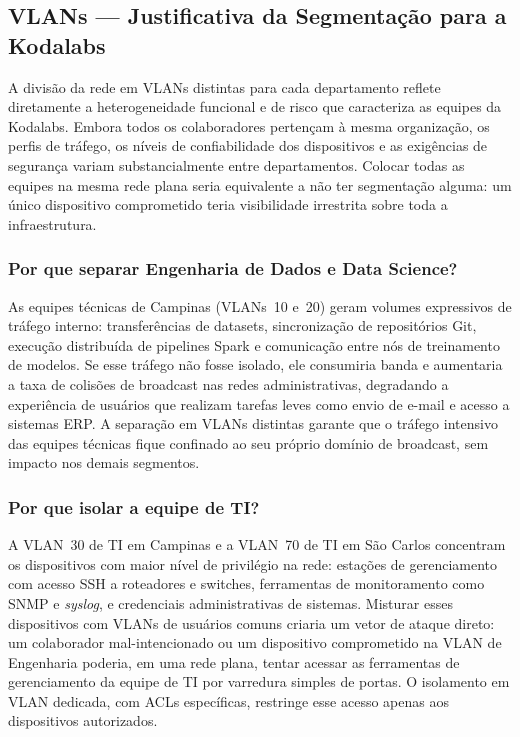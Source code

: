 \subsection{VLANs — Justificativa da Segmentação para a Kodalabs}

A divisão da rede em VLANs distintas para cada departamento reflete diretamente
a heterogeneidade funcional e de risco que caracteriza as equipes da Kodalabs.
Embora todos os colaboradores pertençam à mesma organização, os perfis de tráfego,
os níveis de confiabilidade dos dispositivos e as exigências de segurança variam
substancialmente entre departamentos. Colocar todas as equipes na mesma rede plana
seria equivalente a não ter segmentação alguma: um único dispositivo comprometido
teria visibilidade irrestrita sobre toda a infraestrutura.

\subsubsection{Por que separar Engenharia de Dados e Data Science?}

As equipes técnicas de Campinas (VLANs~10 e~20) geram volumes expressivos de
tráfego interno: transferências de datasets, sincronização de repositórios Git,
execução distribuída de pipelines Spark e comunicação entre nós de treinamento de
modelos. Se esse tráfego não fosse isolado, ele consumiria banda e aumentaria a
taxa de colisões de broadcast nas redes administrativas, degradando a experiência
de usuários que realizam tarefas leves como envio de e-mail e acesso a sistemas ERP.
A separação em VLANs distintas garante que o tráfego intensivo das equipes técnicas
fique confinado ao seu próprio domínio de broadcast, sem impacto nos demais
segmentos.

\subsubsection{Por que isolar a equipe de TI?}

A VLAN~30 de TI em Campinas e a VLAN~70 de TI em São Carlos concentram os
dispositivos com maior nível de privilégio na rede: estações de gerenciamento com
acesso SSH a roteadores e switches, ferramentas de monitoramento como SNMP e
\textit{syslog}, e credenciais administrativas de sistemas. Misturar esses
dispositivos com VLANs de usuários comuns criaria um vetor de ataque direto: um
colaborador mal-intencionado ou um dispositivo comprometido na VLAN de Engenharia
poderia, em uma rede plana, tentar acessar as ferramentas de gerenciamento da
equipe de TI por varredura simples de portas. O isolamento em VLAN dedicada, com
ACLs específicas, restringe esse acesso apenas aos dispositivos autorizados.

